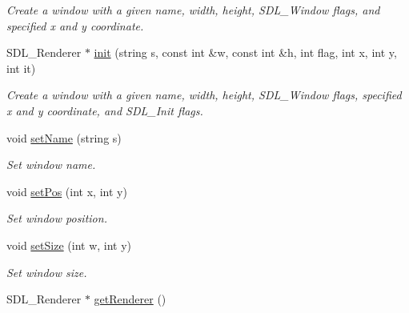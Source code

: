 \begin{DoxyCompactItemize}
\begin{DoxyCompactList}\small\item\em Create a window with a given name, width, height, S\+D\+L\+\_\+\+Window flags, and specified x and y coordinate. \end{DoxyCompactList}\item 
S\+D\+L\+\_\+\+Renderer $\ast$ \hyperlink{classEngine_aa96fc831b44b6aae0f499360609c574d}{init} (string s, const int \&w, const int \&h, int flag, int x, int y, int it)\hypertarget{classEngine_aa96fc831b44b6aae0f499360609c574d}{}\label{classEngine_aa96fc831b44b6aae0f499360609c574d}

\begin{DoxyCompactList}\small\item\em Create a window with a given name, width, height, S\+D\+L\+\_\+\+Window flags, specified x and y coordinate, and S\+D\+L\+\_\+\+Init flags. \end{DoxyCompactList}\item 
void \hyperlink{classEngine_ae59bcd31693811574953ba835ecb09bb}{set\+Name} (string s)\hypertarget{classEngine_ae59bcd31693811574953ba835ecb09bb}{}\label{classEngine_ae59bcd31693811574953ba835ecb09bb}

\begin{DoxyCompactList}\small\item\em Set window name. \end{DoxyCompactList}\item 
void \hyperlink{classEngine_a6133368973d175ef8915cc8033958b2b}{set\+Pos} (int x, int y)\hypertarget{classEngine_a6133368973d175ef8915cc8033958b2b}{}\label{classEngine_a6133368973d175ef8915cc8033958b2b}

\begin{DoxyCompactList}\small\item\em Set window position. \end{DoxyCompactList}\item 
void \hyperlink{classEngine_ada9e7e5de3b47113fc39fcabfe298f9e}{set\+Size} (int w, int y)\hypertarget{classEngine_ada9e7e5de3b47113fc39fcabfe298f9e}{}\label{classEngine_ada9e7e5de3b47113fc39fcabfe298f9e}

\begin{DoxyCompactList}\small\item\em Set window size. \end{DoxyCompactList}\item 
S\+D\+L\+\_\+\+Renderer $\ast$ \hyperlink{classEngine_ae42b73be55ab0fa034a0f7dea156cf9c}{get\+Renderer} ()\hypertarget{classEngine_ae42b73be55ab0fa034a0f7dea156cf9c}{}\label{classEngine_ae42b73be55ab0fa034a0f7dea156cf9c}


\end{DoxyCompactItemize}

